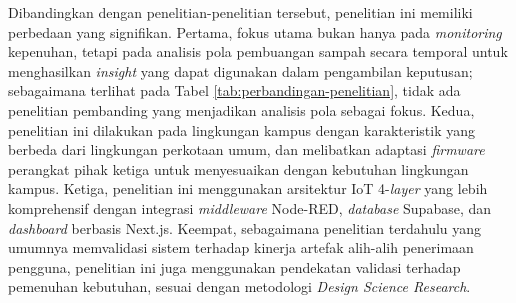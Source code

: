 Dibandingkan dengan penelitian-penelitian tersebut, penelitian ini memiliki perbedaan yang signifikan. Pertama, fokus utama bukan hanya pada \textit{monitoring} kepenuhan, tetapi pada analisis pola pembuangan sampah secara temporal untuk menghasilkan \textit{insight} yang dapat digunakan dalam pengambilan keputusan; sebagaimana terlihat pada Tabel \ref{tab:perbandingan-penelitian}, tidak ada penelitian pembanding yang menjadikan analisis pola sebagai fokus. Kedua, penelitian ini dilakukan pada lingkungan kampus dengan karakteristik yang berbeda dari lingkungan perkotaan umum, dan melibatkan adaptasi \textit{firmware} perangkat pihak ketiga untuk menyesuaikan dengan kebutuhan lingkungan kampus. Ketiga, penelitian ini menggunakan arsitektur IoT 4-\textit{layer} yang lebih komprehensif dengan integrasi \textit{middleware} Node-RED, \textit{database} Supabase, dan \textit{dashboard} berbasis Next.js. Keempat, sebagaimana penelitian terdahulu yang umumnya memvalidasi sistem terhadap kinerja artefak alih-alih penerimaan pengguna, penelitian ini juga menggunakan pendekatan validasi terhadap pemenuhan kebutuhan, sesuai dengan metodologi \textit{Design Science Research}.